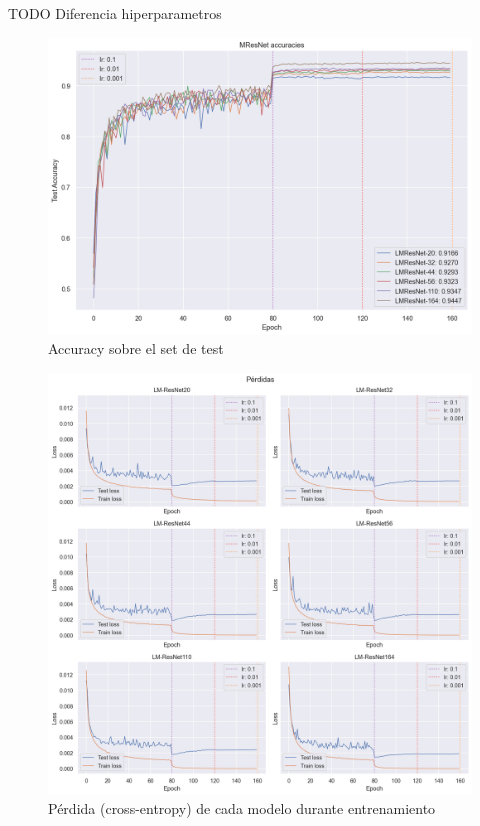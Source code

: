 \documentclass[titlepage,a4paper,oneside]{article}
\begin{document}
TODO Diferencia hiperparametros

\begin{figure}[H]
\centering
\includegraphics[width=\textwidth]{images/accuracy.png}
\caption{Accuracy sobre el set de test}
\label{test_set_acc}
\end{figure}

\begin{figure}[H]
\centering
\includegraphics[width=\textwidth]{images/loss.png}
\caption{Pérdida (cross-entropy) de cada modelo durante entrenamiento}
\label{train_loss}
\end{figure}
\end{document}
